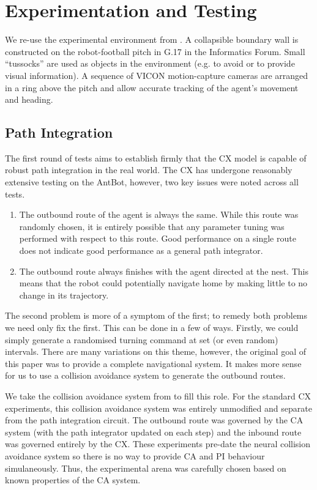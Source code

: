 \documentclass[a4paper,11pt,twoside,openright]{article}
\let\oldsection\section
\def\section{\cleardoublepage\oldsection}
\begin{document}
\section{Experimentation and Testing}\label{sec:test}
We re-use the experimental environment from \cite{Mitchell2018}. A
collapsible boundary wall is constructed on the robot-football pitch
in G.17 in the Informatics Forum. Small ``tussocks'' are used as
objects in the environment (e.g. to avoid or to provide visual
information). A sequence of VICON motion-capture cameras are arranged
in a ring above the pitch and allow accurate tracking of the agent's
movement and heading.

\subsection{Path Integration}
The first round of tests aims to establish firmly that the CX model is capable of
robust path integration in the real world. The CX has undergone reasonably
extensive testing on the AntBot, however, two key issues were noted across all
tests.

\begin{enumerate}
\item{
  The outbound route of the agent is always the same. While this route
  was randomly chosen, it is entirely possible that any parameter tuning was
  performed with respect to this route. Good performance on a single route does
  not indicate good performance as a general path integrator.
}

\item{
  The outbound route always finishes with the agent directed at the nest. This
  means that the robot could potentially navigate home by making little to no
  change in its trajectory.
}
\end{enumerate}

The second problem is more of a symptom of the first; to remedy both problems we
need only fix the first. This can be done in a few of ways. Firstly, we could
simply generate a randomised turning command at set (or even random) intervals.
There are many variations on this theme, however, the original goal of this paper
was to provide a complete navigational system. It makes more sense for us to use
a collision avoidance system to generate the outbound routes.
\newline\par

We take the collision avoidance system from \cite{Mitchell2018} to fill this
role. For the standard CX experiments, this collision avoidance system was
entirely unmodified and separate from the path integration circuit. The outbound
route was governed by the CA system (with the path integrator updated on each
step) and the inbound route was governed entirely by the CX. These experiments
pre-date the neural collision avoidance system so there is no way to provide
CA and PI behaviour simulaneously. Thus, the experimental arena was carefully
chosen based on known properties of the CA system.
\newline
\par
\end{document}
